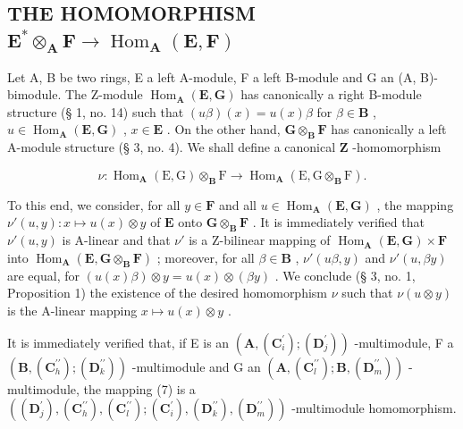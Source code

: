 \subsection{\texorpdfstring{THE HOMOMORPHISM \(\mathbf{E}^* \otimes_{\mathbf{A}} \mathbf{F} \to \operatorname{Hom}_{\mathbf{A}}(\mathbf{E}, \mathbf{F})\)}{THE HOMOMORPHISM \textbackslash mathbf\{E\}\^{}* \textbackslash otimes\_\{\textbackslash mathbf\{A\}\} \textbackslash mathbf\{F\} \textbackslash to \textbackslash operatorname\{Hom\}\_\{\textbackslash mathbf\{A\}\}(\textbackslash mathbf\{E\}, \textbackslash mathbf\{F\})}}

Let A, B be two rings, E a left A-module, F a left B-module and G an (A, B)-bimodule. The Z-module \(\operatorname{Hom}_{\mathbf{A}}(\mathbf{E}, \mathbf{G})\) has canonically a right B-module structure (§ 1, no. 14) such that \((u\beta)(x) = u(x)\beta\) for \(\beta \in \mathbf{B}\) , \(u \in \operatorname{Hom}_{\mathbf{A}}(\mathbf{E}, \mathbf{G})\) , \(x \in \mathbf{E}\) . On the other hand, \(\mathbf{G} \otimes_{\mathbf{B}} \mathbf{F}\) has canonically a left A-module structure (§ 3, no. 4). We shall define a canonical \(\mathbf{Z}\) -homomorphism

\[
\nu : \operatorname{Hom} _ {\mathbf {A}} (\mathrm{E}, \mathrm{G}) \otimes_ {\mathbf {B}} \mathrm{F} \rightarrow \operatorname{Hom} _ {\mathbf {A}} (\mathrm{E}, \mathrm{G} \otimes_ {\mathbf {B}} \mathrm{F}).\tag{7}
\]

To this end, we consider, for all \(y \in \mathbf{F}\) and all \(u \in \operatorname{Hom}_{\mathbf{A}}(\mathbf{E}, \mathbf{G})\) , the mapping \(\nu'(u, y): x \mapsto u(x) \otimes y\) of \(\mathbf{E}\) onto \(\mathbf{G} \otimes_{\mathbf{B}} \mathbf{F}\) . It is immediately verified that \(\nu'(u, y)\) is A-linear and that \(\nu'\) is a Z-bilinear mapping of \(\operatorname{Hom}_{\mathbf{A}}(\mathbf{E}, \mathbf{G}) \times \mathbf{F}\) into \(\operatorname{Hom}_{\mathbf{A}}(\mathbf{E}, \mathbf{G} \otimes_{\mathbf{B}} \mathbf{F})\) ; moreover, for all \(\beta \in \mathbf{B}\) , \(\nu'(u\beta, y)\) and \(\nu'(u, \beta y)\) are equal, for \((u(x)\beta) \otimes y = u(x) \otimes (\beta y)\) . We conclude (§ 3, no. 1, Proposition 1) the existence of the desired homomorphism \(\nu\) such that \(\nu(u \otimes y)\) is the A-linear mapping \(x \mapsto u(x) \otimes y\) .

It is immediately verified that, if E is an \((\mathbf{A}, (\mathbf{C}_{i}^{\prime}) ; (\mathbf{D}_{j}^{\prime}))\) -multimodule, F a \((\mathbf{B}, (\mathbf{C}_{h}^{\prime\prime}) ; (\mathbf{D}_{k}^{\prime\prime}))\) -multimodule and G an \((\mathbf{A}, (\mathbf{C}_{l}^{\prime\prime}) ; \mathbf{B}, (\mathbf{D}_{m}^{\prime\prime}))\) -multimodule, the mapping (7) is a \(((\mathbf{D}_{j}^{\prime}), (\mathbf{C}_{h}^{\prime\prime}), (\mathbf{C}_{l}^{\prime\prime}) ; (\mathbf{C}_{i}^{\prime}), (\mathbf{D}_{k}^{\prime\prime}), (\mathbf{D}_{m}^{\prime\prime}))\) -multimodule homomorphism.

